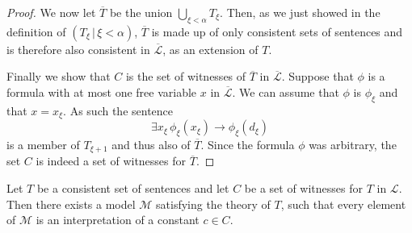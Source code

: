 \documentclass[../../main.tex]{subfiles}
\begin{document}
\begin{proof}
    We now let $\overline{T}$ be the union $\bigcup_{\xi < \alpha} T_\xi$.
    Then, as we just showed in the definition of $\left(T_\xi \, \vert \, \xi < \alpha\right)$,
    $\overline{T}$ is made up of only consistent sets of sentences and is therefore also consistent in $\overline{\mathcal{L}}$,
    as an extension of $T$.

    Finally we show that $C$ is the set of witnesses of $\overline{T}$ in $\overline{\mathcal{L}}$.
    Suppose that $\phi$ is a formula with at most one free variable $x$ in $\overline{\mathcal{L}}$.
    We can assume that $\phi$ is $\phi_\xi$ and that $x = x_\xi$.
    As such the sentence $$\exists x_\xi \, \phi_\xi(x_\xi) \rightarrow \phi_\xi(d_\xi)$$ is a member of $T_{\xi + 1}$ and thus also of $\overline{T}$.
    Since the formula $\phi$ was arbitrary, the set $C$ is indeed a set of witnesses for $\overline{T}$. 
\end{proof}

\begin{lemma}\label{completeness-lemma-2}\cite[Lemma 2.1.2]{Cha90}
    Let $T$ be a consistent set of sentences and let $C$ be a set of witnesses for $T$ in $\mathcal{L}$.
    Then there exists a model $\mathcal{M}$ satisfying the theory of $T$, such that every element of $\mathcal{M}$ is an interpretation of a constant $c \in C$.
\end{lemma} 
\end{document}
